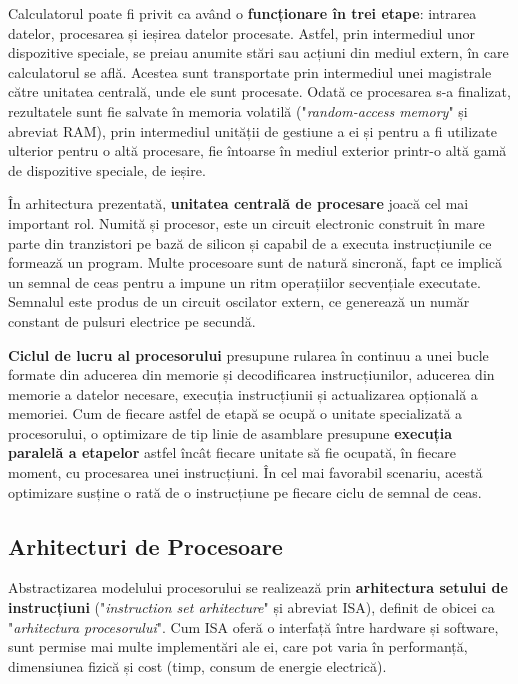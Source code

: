 \documentclass[../../main.tex]{subfiles}
\begin{document}

Calculatorul poate fi privit ca având o \textbf{funcționare în trei etape}: intrarea datelor, procesarea și ieșirea datelor procesate. Astfel, prin intermediul unor dispozitive speciale, se preiau anumite stări sau acțiuni din mediul extern, în care calculatorul se află. Acestea sunt transportate prin intermediul unei magistrale către unitatea centrală, unde ele sunt procesate. Odată ce procesarea s-a finalizat, rezultatele sunt fie salvate în memoria volatilă ("\textit{random-access me\-mory}" și abreviat RAM), prin intermediul unității de gestiune a ei și pentru a fi utilizate ulterior pentru o altă procesare, fie întoarse în mediul exterior printr-o altă gamă de dispozitive speciale, de ieșire.

În arhitectura prezentată, \textbf{unitatea centrală de procesare} joacă cel mai important rol. Numită și procesor, este un circuit electronic construit în mare parte din tranzistori pe bază de silicon și capabil de a executa instrucțiunile ce formează un program. Multe procesoare sunt de natură sincronă, fapt ce implică un semnal de ceas pentru a impune un ritm operațiilor secvențiale executate. Semnalul este produs de un circuit oscilator extern, ce generează un număr constant de pulsuri electrice pe secundă.

\textbf{Ciclul de lucru al procesorului} presupune rularea în continuu a unei bucle formate din aducerea din memorie și decodificarea instrucțiunilor, aducerea din memorie a datelor necesare, execuția instrucțiunii și actualizarea opțională a memoriei. Cum de fiecare astfel de etapă se ocupă o unitate specializată a procesorului, o optimizare de tip linie de asamblare presupune \textbf{execuția para\-lelă a etapelor} astfel încât fiecare unitate să fie ocupată, în fiecare moment, cu procesarea unei instrucțiuni. În cel mai favorabil scenariu, acestă optimizare susține o rată de o instrucțiune pe fiecare ciclu de semnal de ceas.

\newpage

\subsection{Arhitecturi de Procesoare}

Abstractizarea modelului procesorului se realizează prin \textbf{arhitectura setului de instrucțiuni} ("\textit{instruction set arhitecture}" și abreviat ISA), definit de obicei ca "\textit{arhitectura procesorului}". Cum ISA oferă o interfață între hardware și software, sunt permise mai multe implementări ale ei, care pot varia în performanță, dimensiunea fizică și cost (timp, consum de energie electrică).
\end{document}
